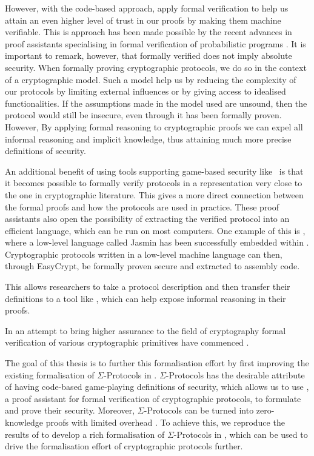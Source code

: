 However, with the code-based approach, apply
formal verification to help us attain an even higher level of trust in our
proofs by making them machine verifiable.
This is approach has been made possible by the recent advances in proof assistants
specialising in formal verification of probabilistic programs \cite{SOK:CAC}.
It is important to remark, however, that formally verified does not imply
absolute security. When formally proving cryptographic protocols, we do so in
the context of a cryptographic model.
Such a model help us by reducing the complexity of our protocols
by limiting external influences or by giving access to idealised
functionalities. If the assumptions made in the model used are unsound, then the
protocol would still be insecure, even through it has been formally proven.
However, By applying formal
reasoning to cryptographic proofs we can expel all informal reasoning and
implicit knowledge, thus attaining much more precise definitions of security.

An additional benefit of using tools supporting game-based security like \easycrypt\ is that
it becomes possible to formally verify protocols in a representation very close
to the one in cryptographic literature. This gives a more direct connection between
the formal proofs and how the protocols are used in practice.
These proof assistants also open the possibility of extracting the verified
protocol into an efficient language, which can be run on most computers.
One example of this is \easycrypt, where a low-level language called Jasmin has
been successfully embedded within \cite{easycrypt-jasmin}.
Cryptographic protocols written in a low-level machine language can
then, through EasyCrypt, be formally proven secure and extracted to assembly code.


This allows researchers to take a protocol description and then transfer their
definitions to a tool like \easycrypt, which can help expose informal reasoning
in their proofs.


In an attempt to bring higher assurance to the field of cryptography formal
verification of various cryptographic primitives have commenced
\cite{SOK:CAC,ec_intro,cryptoeprint:2019:1185,certicrypt_sigma}.

The goal of this thesis is to further this formalisation effort by first improving the
existing formalisation of $\Sigma$-Protocols in \easycrypt.
$\Sigma$-Protocols has the desirable attribute of having code-based
game-playing definitions of security, which allows us to use \easycrypt, a
proof assistant for formal verification of cryptographic protocols, to formulate
and prove their security. Moreover, $\Sigma$-Protocols can be turned into
zero-knowledge proofs with limited overhead \cite{zkboo}.
To achieve this, we reproduce the results of \citet{cryptoeprint:2019:1185} to
develop a rich formalisation of $\Sigma$-Protocols in \easycrypt, which can be
used to drive the formalisation effort of cryptographic protocols further.

